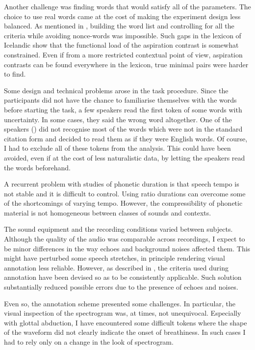 \documentclass[11pt,a4paper,openany]{memoir}\usepackage[]{graphicx}\usepackage[]{color}
\begin{document}
Another challenge was finding words that would satisfy all of the parameters.
The choice to use real words came at the cost of making the experiment design less balanced.
As mentioned in , building the word list and controlling for all the criteria while avoiding nonce-words was impossible.
Such gaps in the lexicon of Icelandic show that the functional load of the aspiration contrast is somewhat constrained.
Even if from a more restricted contextual point of view, aspiration contrasts can be found everywhere in the lexicon, true minimal pairs were harder to find.

Some design and technical problems arose in the task procedure.
Since the participants did not have the chance to familiarise themselves with the words before starting the task, a few speakers read the first token of some words with uncertainty.
In some cases, they said the wrong word altogether.
One of the speakers () did not recognise most of the words which were not in the standard citation form and decided to read them as if they were English words.
Of course, I had to exclude all of these tokens from the analysis.
This could have been avoided, even if at the cost of less naturalistic data, by letting the speakers read the words beforehand.

A recurrent problem with studies of phonetic duration is that speech tempo is not stable and it is difficult to control.
Using ratio durations can overcome some of the shortcomings of varying tempo.
However, the compressibility of phonetic material is not homogeneous between classes of sounds and contexts.

The sound equipment and the recording conditions varied between subjects.
Although the quality of the audio was comparable across recordings, I expect to be minor differences in the way echoes and background noises affected them.
This might have perturbed some speech stretches, in principle rendering visual annotation less reliable.
However, as described in , the criteria used during annotation have been devised so as to be consistently applicable.
Such solution substantially reduced possible errors due to the presence of echoes and noises.

Even so, the annotation scheme presented some challenges.
In particular, the visual inspection of the spectrogram was, at times, not unequivocal.
Especially with glottal abduction, I have encountered some difficult tokens where the shape of the waveform did not clearly indicate the onset of breathiness.
In such cases I had to rely only on a change in the look of spectrogram.
\end{document}
